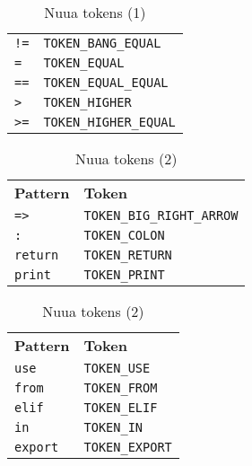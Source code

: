 \begin{table}[H]
\begin{subtable}{0.45\textwidth}
\begin{tabular}{ l l }
            \texttt{!=} & \texttt{TOKEN\_BANG\_EQUAL} \\
            \texttt{=} & \texttt{TOKEN\_EQUAL} \\
            \texttt{==} & \texttt{TOKEN\_EQUAL\_EQUAL} \\
            \texttt{>} & \texttt{TOKEN\_HIGHER} \\
            \texttt{>=} & \texttt{TOKEN\_HIGHER\_EQUAL} \\
		\end{tabular}
		\caption{}
	\end{subtable}
	\caption{Nuua tokens (1)}
    \label{fig:nuua_tokens_1}
\end{table}

\begin{table}[H]
	\centering
	\begin{subtable}{0.45\textwidth}
		\centering
        \begin{tabular}{ l l }
            \textbf{Pattern} & \textbf{Token} \\
            \texttt{=>} & \texttt{TOKEN\_BIG\_RIGHT\_ARROW} \\
            \texttt{:} & \texttt{TOKEN\_COLON} \\
            \texttt{return} & \texttt{TOKEN\_RETURN} \\
            \texttt{print} & \texttt{TOKEN\_PRINT} \\
		\end{tabular}
		\caption{}
	\end{subtable}
	\begin{subtable}{0.45\textwidth}
		\centering
        \begin{tabular}{ l l }
            \textbf{Pattern} & \textbf{Token} \\
            \texttt{use} & \texttt{TOKEN\_USE} \\
            \texttt{from} & \texttt{TOKEN\_FROM} \\
            \texttt{elif} & \texttt{TOKEN\_ELIF} \\
            \texttt{in} & \texttt{TOKEN\_IN} \\
            \texttt{export} & \texttt{TOKEN\_EXPORT} \\
		\end{tabular}
		\caption{}
	\end{subtable}
	\caption{Nuua tokens (2)}
    \label{fig:nuua_tokens_2}
\end{table}

